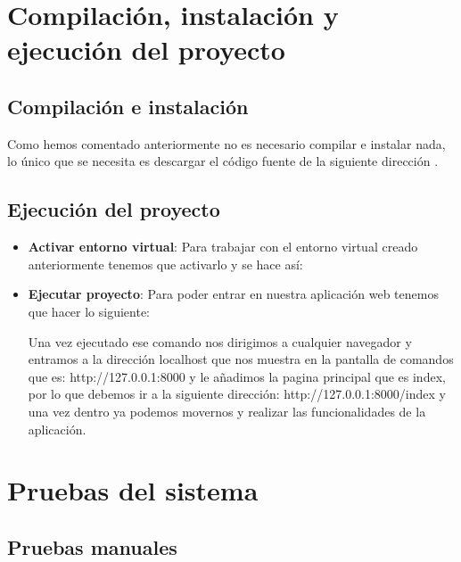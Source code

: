 \section{Compilación, instalación y ejecución del proyecto}

\subsection{Compilación e instalación}

Como hemos comentado anteriormente no es necesario compilar e instalar nada, lo único que se necesita es descargar el código fuente de la siguiente dirección \cite{Repositorio}.

\subsection{Ejecución del proyecto}

\begin{itemize}
	\item \textbf{Activar entorno virtual}: Para trabajar con el entorno virtual creado anteriormente tenemos que activarlo y se hace así:
	
	\item \textbf{Ejecutar proyecto}: Para poder entrar en nuestra aplicación web tenemos que hacer lo siguiente:
	
	Una vez ejecutado ese comando nos dirigimos a cualquier navegador y entramos a la dirección localhost que nos muestra en la pantalla de comandos que es: http://127.0.0.1:8000 y le añadimos la pagina principal que es index, por lo que debemos ir a la siguiente dirección: http://127.0.0.1:8000/index y una vez dentro ya podemos movernos y realizar las funcionalidades de la aplicación.
\end{itemize}

\section{Pruebas del sistema} \label{pruebas}

\subsection{Pruebas manuales}

